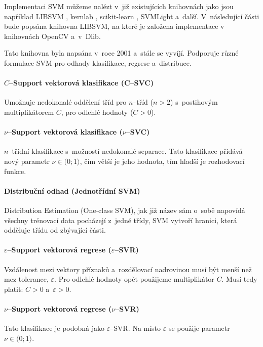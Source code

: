 Implementaci SVM můžeme nalézt v~již existujících knihovnách jako jsou například LIBSVM \cite{libsvm}, kernlab \cite{kernlab}, scikit-learn \cite{scikit-learn}, SVMLight \cite{svmlight} a~další. V~následující části bude popsána knihovna LIBSVM, na které je založena implementace v~ knihovnách OpenCV a~v~Dlib.  

Tato knihovna byla napsána v~roce 2001 \cite{libsvm} a~stále se vyvíjí. Podporuje různé formulace SVM pro odhady klasifikace, regrese a~distribuce.

\paragraph*{$C$--Support vektorová klasifikace (C--SVC)} 
Umožnuje nedokonalé oddělení tříd pro $n$--tříd ($n > 2$) s~postihovým multiplikátorem $C$, pro odlehlé hodnoty ($C > 0$). \cite{csvmclass}

\paragraph*{$\nu$--Support vektorová klasifikace ($\nu$--SVC)} 
$n$--třídní klasifikace s~možností nedokonalé separace. Tato klasifikace přidává nový parametr $\nu \in (0;1\rangle$, čím větší je jeho hodnota, tím hladší je rozhodovací funkce. \cite{nusvmsvrclass}

\paragraph*{Distribuční odhad (Jednotřídní SVM)} 
Distribution Estimation (One-class SVM), jak již název sám o~sobě napovídá všechny trénovací data pocházejí z~jedné třídy, SVM vytvoří hranici, která odděluje třídu od zbývající části. \cite{oneclasssvm}

\paragraph*{$\varepsilon$--Support vektorová regrese ($\varepsilon$--SVR)} 
Vzdálenost mezi vektory příznaků a~rozdělovací nadrovinou musí být menší než mez tolerance, $\varepsilon$. Pro odlehlé hodnoty opět použijeme multiplikátor $C$. Musí tedy platit: $C > 0$ a~$\varepsilon > 0$. \cite{svrsvm}

\paragraph*{$\nu$--Support vektorová regrese ($\nu$--SVR)} 
Tato klasifikace je podobná jako $\varepsilon$--SVR. Na místo $\varepsilon$ se použije parametr $\nu \in (0;1\rangle$. \cite{nusvmsvrclass}

